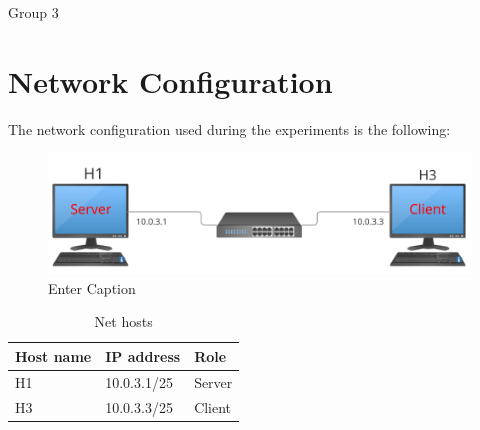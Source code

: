 \documentclass{exam}
\begin{document}
\newcommand{\LoggaEng}{
	\textsc{\Huge Uppsala University}\\[0.7cm]
	\texttt{[image: Uppsala\_University\_seal\_svg.png]}\\[0.5cm]
}

\begin{titlepage}

	\center


	\LoggaSwe


	\Large Group 3\\

	\vfill

\end{titlepage}
\pagebreak

\section{Network Configuration}

The network configuration used during the experiments is the following:
\begin{figure}[H]
    \centering
    \includegraphics[width=0.75\linewidth]{network-topology.png}
    \caption{Enter Caption}
    \label{fig:enter-label}
\end{figure}
\begin{table}[h!]
  \begin{center}
    \begin{tabular}{|l|l|l|}
      \hline
      \textbf{Host name} & \textbf{IP address} & Role \\
      \hline
      H1 & 10.0.3.1/25 & Server \\
      \hline
      H3 & 10.0.3.3/25  & Client \\
      \hline
    \end{tabular}
  \end{center}
  \caption{Net hosts}\label{tab:net-hosts}
\end{table}
\end{document}
